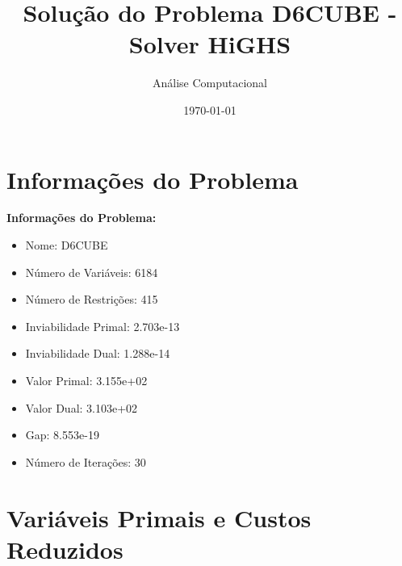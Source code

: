\documentclass[12pt]{article}
\title{Solução do Problema D6CUBE - Solver HiGHS}
\author{Análise Computacional}
\date{\today}
\begin{document}
\maketitle

\section{Informações do Problema}

\textbf{Informações do Problema:}
\begin{itemize}
\item Nome: D6CUBE
\item Número de Variáveis: 6184
\item Número de Restrições: 415
\item Inviabilidade Primal: 2.703e-13
\item Inviabilidade Dual: 1.288e-14
\item Valor Primal: 3.155e+02
\item Valor Dual: 3.103e+02
\item Gap: 8.553e-19
\item Número de Iterações: 30
\end{itemize}


\section{Variáveis Primais e Custos Reduzidos}
\end{document}
